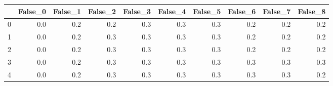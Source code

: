 \begin{tabular}{lrrrrrrrrr}
\toprule
{} &  False\_0 &  False\_1 &  False\_2 &  False\_3 &  False\_4 &  False\_5 &  False\_6 &  False\_7 &  False\_8 \\ \hline
\midrule
0 &      0.0 &      0.2 &      0.2 &      0.3 &      0.3 &      0.3 &      0.2 &      0.2 &      0.2 \\ \hline
1 &      0.0 &      0.2 &      0.3 &      0.3 &      0.3 &      0.3 &      0.2 &      0.2 &      0.2 \\ \hline
2 &      0.0 &      0.2 &      0.3 &      0.3 &      0.3 &      0.3 &      0.2 &      0.2 &      0.2 \\ \hline
3 &      0.0 &      0.2 &      0.3 &      0.3 &      0.3 &      0.3 &      0.3 &      0.3 &      0.3 \\ \hline
4 &      0.0 &      0.2 &      0.3 &      0.3 &      0.3 &      0.3 &      0.3 &      0.3 &      0.2 \\ \hline
\bottomrule
\end{tabular}
